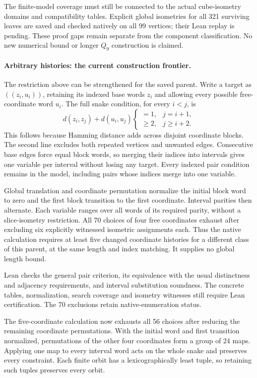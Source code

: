 \documentclass[11pt,a4paper]{article}
\begin{document}
The finite-model coverage must still be connected to the actual
cube-isometry domains and compatibility tables. Explicit global
isometries for all 321 surviving leaves are saved and checked
natively on all 99 vertices; their Lean replay is pending. These
proof gaps remain separate from the component classification.
No new numerical bound or longer $Q_9$ construction is claimed.

\paragraph{Arbitrary histories: the current construction frontier.}
The restriction above can be strengthened for the saved parent.
Write a target as $((z_i,u_i))$, retaining its indexed base words
$z_i$ and allowing every possible free-coordinate word $u_i$.
The full snake condition, for every $i<j$, is
\[
d(z_i,z_j)+d(u_i,u_j)
\begin{cases}
=1,&j=i+1,\\
\ge2,&j\ge i+2.
\end{cases}
\]
This follows because Hamming distance adds across disjoint coordinate
blocks. The second line excludes both repeated vertices and unwanted
edges. Consecutive base edges force equal block words, so merging
their indices into intervals gives one variable per interval without
losing any target. Every indexed pair condition remains in the model,
including pairs whose indices merge into one variable.

Global translation and coordinate permutation normalize the initial
block word to zero and the first block transition to the first
coordinate. Interval parities then alternate. Each variable ranges
over all words of its required parity, without a slice-isometry
restriction. All 70 choices of four free coordinates exhaust after
excluding six explicitly witnessed isometric assignments each.
Thus the native calculation requires at least five changed coordinate
histories for a different class of this parent, at the same length
and index matching. It supplies no global length bound.

Lean checks the general pair criterion, its equivalence with the
usual distinctness and adjacency requirements, and interval
substitution soundness. The concrete tables, normalization, search
coverage and isometry witnesses still require Lean certification.
The 70 exclusions retain native-enumeration status.

The five-coordinate calculation now exhausts all 56 choices after
reducing the remaining coordinate permutations. With the initial
word and first transition normalized, permutations of the other
four coordinates form a group of 24 maps. Applying one map to
every interval word acts on the whole snake and preserves every
constraint. Each finite orbit has a lexicographically least tuple,
so retaining such tuples preserves every orbit.
\end{document}
